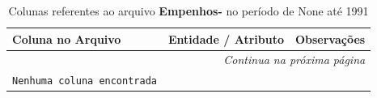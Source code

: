 \small
\begin{longtable}{|p{4.0cm}|p{5.0cm}|p{5.5cm}|}
\caption{Colunas referentes ao arquivo \textbf{Empenhos-} no período de None até 1991}
\label{tabela-mapeamento-base-grupo-Empenhos--periodo-None-1991} \\ 
    \hline
    \textbf{Coluna no Arquivo} & \textbf{Entidade / Atributo} & \textbf{Observações} \\ \hline
    \endhead

    \hline \multicolumn{3}{r}{\textit{Continua na próxima página}} \\ \hline
    \endfoot

    \hline
    \endlastfoot

    \texttt{Nenhuma coluna encontrada} &  & \\ \hline 
\end{longtable}
\normalsize

\vspace{0.5cm}

